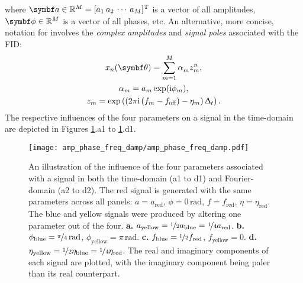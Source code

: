 where $\bda \in \mathbb{R}^M = [a_1 \hspace{2pt} a_2 \hspace{2pt} \cdots
\hspace{2pt} a_M]^{\mathrm{T}}$ is a vector of all amplitudes, $\bdphi \in
\mathbb{R}^M$ is a vector of all phases, etc.
An alternative, more concise, notation for 
involves the \emph{complex amplitudes} and \emph{signal poles} associated with
the \ac{FID}:
\begin{subequations}
    \begin{gather}
        x_n(\bth) = \sumM \alpha_m^{\vphantom{n}} z_m^n,\\
        \alpha_m = \amexpphim,\\
        z_m = \exp\left(
            \left(2 \pi \iu \left(f_m - \foff\right) - \eta_m\right) \Dt
        \right).\label{eq:signal-pole}
    \end{gather}
    \label{eq:x-alpha-z}%
\end{subequations}
The respective influences of the four parameters on a signal in the time-domain
are depicted in Figures \ref{fig:amp-phase-freq-damp}.a1 to
\ref{fig:amp-phase-freq-damp}.d1.
\begin{figure}
    \centering
    \texttt{[image: amp\_phase\_freq\_damp/amp\_phase\_freq\_damp.pdf]}
    \caption[
        An illustration of the influence of the four parameters associated
        with a signal in both the time-domain and the Fourier-domain.
    ]{
        An illustration of the influence of the four parameters associated
        with a signal in both the time-domain (a1 to d1) and Fourier-domain
        (a2 to d2).
        The red signal is generated with the same parameters across all panels:
        $a = a_{\text{red}}$, $\phi = 0\,\unit{\radian}$, $f = f_{\text{red}}$,  $\eta =
        \eta_{\text{red}}$.  The blue and yellow signals were produced by
        altering one parameter out of the four.
        \textbf{a.} $a_{\text{yellow}} = \nicefrac{1}{2} a_{\text{blue}} =
        \nicefrac{1}{4} a_{\text{red}}$.
        \textbf{b.}
        $\phi_{\text{blue}} = \nicefrac{\pi}{4}\,\unit{\radian}$,
        $\phi_{\text{yellow}} = \pi\,\unit{\radian}$.
        \textbf{c.}
        $f_{\text{blue}} = \nicefrac{1}{2} f_{\text{red}}$,
        $f_{\text{yellow}} = 0$.
        \textbf{d.}
        $\eta_{\text{yellow}} =
        \nicefrac{1}{2}\eta_{\text{blue}} =
        \nicefrac{1}{4}\eta_{\text{red}}$.
        The real and imaginary components of each signal are plotted, with the
        imaginary component being paler than its real counterpart.
    }
    \label{fig:amp-phase-freq-damp}%
\end{figure}


